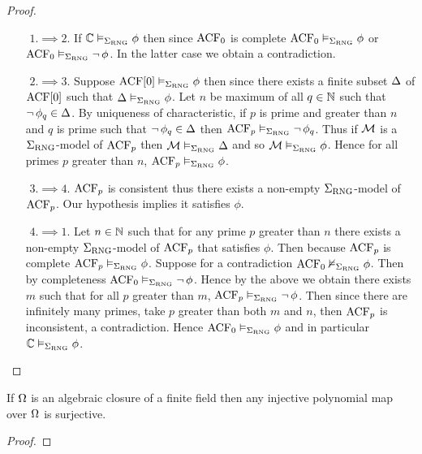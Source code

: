 \begin{proof}~
    \begin{itemize}
        \item[${}$]$1. \implies 2.$ If $\mathbb{C} \vDash_{\Sigma_{\mathrm{RNG}}} \phi$ then since
        $\operatorname{ACF}_0$ is complete 
        $\operatorname{ACF}_0 \vDash_{\Sigma_{\mathrm{RNG}}} \phi$ or $\operatorname{ACF}_0 \vDash_{\Sigma_{\mathrm{RNG}}} \neg\, \phi$.
        In the latter case we obtain a contradiction.
        \item[${}$]$2. \implies 3.$ Suppose $\operatorname{ACF}[0] \vDash_{\Sigma_{\mathrm{RNG}}} \phi$
        then since 
        there exists a finite subset $\Delta$ of $\operatorname{ACF}[0]$ such that
        $\Delta \vDash_{\Sigma_{\mathrm{RNG}}} \phi$.
        Let $n$ be maximum of all $q \in \mathbb{N}$ such that 
        $\neg\, \phi_q \in \Delta$.
        By uniqueness of characteristic, 
        if $p$ is prime and greater than $n$ and $q$ is prime such that 
        $\neg\, \phi_q \in \Delta$ then
        $\operatorname{ACF}_p \vDash_{\Sigma_{\mathrm{RNG}}} \neg\, \phi_q$.
        Thus if $\mathcal{M}$ is a $\Sigma_{\mathrm{RNG}}$-model of $\operatorname{ACF}_p$ then 
        $\mathcal{M} \vDash_{\Sigma_{\mathrm{RNG}}} \Delta$ and so $\mathcal{M} \vDash_{\Sigma_{\mathrm{RNG}}} \phi$.
        Hence for all primes $p$ greater than $n$,
        $\operatorname{ACF}_p \vDash_{\Sigma_{\mathrm{RNG}}} \phi$.
        \item[${}$]$3. \implies 4.$ $\operatorname{ACF}_p$ is consistent thus there exists a 
        non-empty $\Sigma_{\mathrm{RNG}}$-model of $\operatorname{ACF}_p$. 
        Our hypothesis implies it satisfies $\phi$.
        \item[${}$]$4. \implies 1.$ Let $n \in \mathbb{N}$ such that for any prime $p$
        greater than $n$ there exists a non-empty $\Sigma_{\mathrm{RNG}}$-model of $\operatorname{ACF}_p$
        that satisfies $\phi$.
        Then because $\operatorname{ACF}_p$ is complete $\operatorname{ACF}_p \vDash_{\Sigma_{\mathrm{RNG}}} \phi$.
        Suppose for a contradiction $\operatorname{ACF}_0 \nvDash_{\Sigma_{\mathrm{RNG}}} \phi$.
        Then by completeness $\operatorname{ACF}_0 \vDash_{\Sigma_{\mathrm{RNG}}} \neg\, \phi$.
        Hence by the above we obtain there exists $m$ such that 
        for all $p$ greater than $m$, 
        $\operatorname{ACF}_p \vDash_{\Sigma_{\mathrm{RNG}}} \neg\, \phi$.
        Then since there are infinitely many primes, 
        take $p$ greater than both $m$ and $n$,
        then $\operatorname{ACF}_p$ is inconsistent, a contradiction.
        Hence $\operatorname{ACF}_0 \vDash_{\Sigma_{\mathrm{RNG}}} \phi$
        and in particular $\mathbb{C} \vDash_{\Sigma_{\mathrm{RNG}}} \phi$. 
    \end{itemize}
\end{proof}

\begin{lem}
    If $\Omega$ is an algebraic closure of a finite field
    then any injective polynomial map over $\Omega$ is surjective.
\end{lem}
\begin{proof}
\end{proof}

